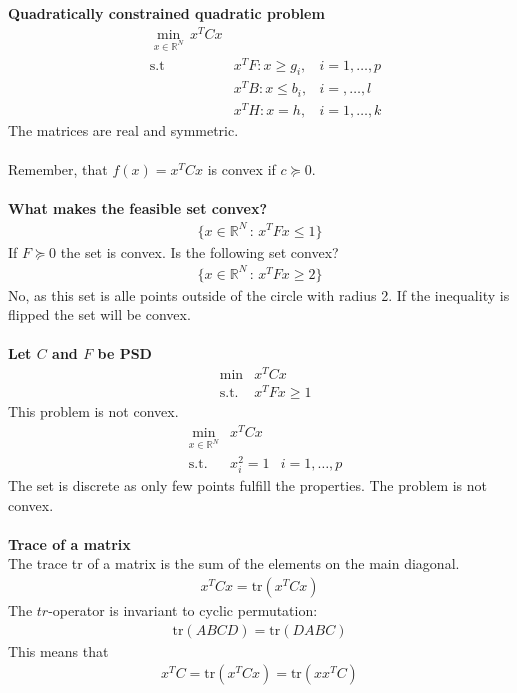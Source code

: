 \documentclass[12pt,a4paper]{report}
\author{Frederik Appel Vardinghus-Nielsen}
\begin{document}
\noindent\textbf{Quadratically constrained quadratic problem}\\
\begin{align*}
&\underset{x\in\mathbb{R}^N}\min\,x^TCx\\
&\text{s.t}&x^TF:x\geq g_i,&i=1,\ldots,p\\
& & x^TB:x\leq b_i,&i=,\ldots,l\\
& & x^TH:x=h,&i=1,\ldots,k
\end{align*}
The matrices are real and symmetric.\\\\
Remember, that $f(x)=x^TCx$ is convex if $c\succeq 0$.\\\\
\textbf{What makes the feasible set convex?}
\begin{align*}
\{x\in\mathbb{R}^N\,:\,x^TFx\leq1\}
\end{align*}
If $F\succeq 0$ the set is convex. Is the following set convex?
\begin{align*}
\{x\in\mathbb{R}^N\,:\,x^TFx\geq 2\}
\end{align*}
No, as this set is alle points outside of the circle with radius 2. If the inequality is flipped the set will be convex.\\\\
\textbf{Let $C$ and $F$ be PSD}\\
\begin{align*}
&\min&x^TCx\\
&\text{s.t.}&x^TFx\geq 1
\end{align*}
This problem is not convex.
\begin{align*}
&\underset{x\in\mathbb{R}^N}\min&x^TCx\\
&\text{s.t.}&x_i^2=1&i=1,\ldots,p
\end{align*}
The set is discrete as only few points fulfill the properties. The problem is not convex.\\\\
\textbf{Trace of a matrix}\\
The trace tr of a matrix is the sum of the elements on the main diagonal.
\begin{align*}
x^TCx=\text{tr}(x^TCx)
\end{align*}
The $tr$-operator is invariant to cyclic permutation:
\begin{align*}
\text{tr}(ABCD)=\text{tr}(DABC)
\end{align*}
This means that
\begin{align*}
x^TC=\text{tr}(x^TCx)=\text{tr}(xx^TC)
\end{align*}
\end{document}
